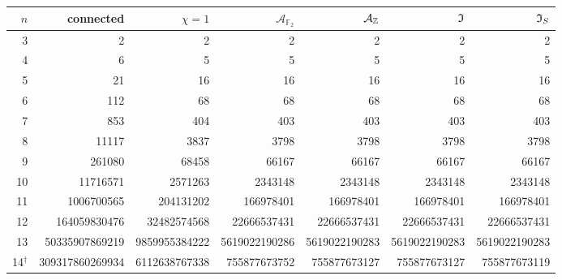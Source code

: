 \begingroup
\footnotesize
\setlength{\tabcolsep}{2pt}
\renewcommand{\arraystretch}{1.12}
\begin{tabular*}{\textwidth}{@{\extracolsep{\fill}}rrrrrrr@{}}
\toprule
$n$ & connected & $\chi=1$ & $\mathcal A_{\mathbb F_2}$ & $\mathcal A_{\mathbb Z}$ & $\mathfrak I$ & $\mathfrak I_S$ \\
\midrule
3 & \num{2} & \num{2} & \num{2} & \num{2} & \num{2} & \num{2} \\
4 & \num{6} & \num{5} & \num{5} & \num{5} & \num{5} & \num{5} \\
5 & \num{21} & \num{16} & \num{16} & \num{16} & \num{16} & \num{16} \\
6 & \num{112} & \num{68} & \num{68} & \num{68} & \num{68} & \num{68} \\
7 & \num{853} & \num{404} & \num{403} & \num{403} & \num{403} & \num{403} \\
8 & \num{11117} & \num{3837} & \num{3798} & \num{3798} & \num{3798} & \num{3798} \\
9 & \num{261080} & \num{68458} & \num{66167} & \num{66167} & \num{66167} & \num{66167} \\
10 & \num{11716571} & \num{2571263} & \num{2343148} & \num{2343148} & \num{2343148} & \num{2343148} \\
11 & \num{1006700565} & \num{204131202} & \num{166978401} & \num{166978401} & \num{166978401} & \num{166978401} \\
12 & \num{164059830476} & \num{32482574568} & \num{22666537431} & \num{22666537431} & \num{22666537431} & \num{22666537431} \\
13 & \num{50335907869219} & \num{9859955384222} & \num{5619022190286} & \num{5619022190283} & \num{5619022190283} & \num{5619022190283} \\
14$^{\dagger}$ & \num{309317860269934} & \num{6112638767338} & \num{755877673752} & \num{755877673127} & \num{755877673127} & \num{755877673119} \\
\bottomrule
\end{tabular*}
\par\medskip
